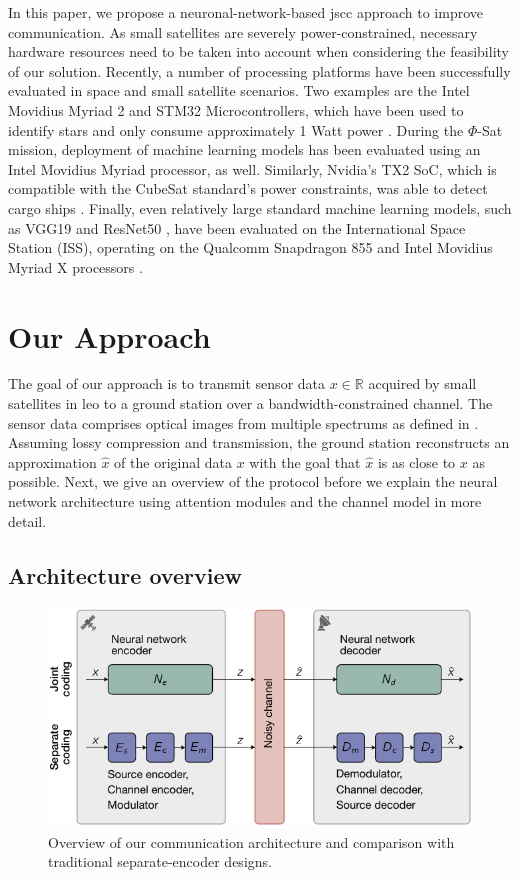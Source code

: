 \documentclass[conference]{IEEEtran}
\begin{document}
In this paper, we propose a neuronal-network-based \ac{jscc} approach to improve communication.
As small satellites are severely power-constrained, necessary hardware resources need to be taken into account when considering the feasibility of our solution.
Recently, a number of processing platforms have been successfully evaluated  in space and small satellite scenarios.
Two examples are the Intel Movidius Myriad 2 and STM32 Microcontrollers, which have been used to identify stars and only consume approximately 1 Watt power \cite{8556744}.
During the $\Phi$-Sat mission, deployment of machine learning models has been evaluated using an Intel Movidius Myriad processor, as well.
Similarly, Nvidia's TX2 SoC, which is compatible with the CubeSat standard's power constraints, was able to detect cargo ships \cite{8556744}.
Finally, even relatively large standard machine learning models, such as VGG19 \cite{DBLP:journals/corr/SimonyanZ14a} and ResNet50 \cite{7780459}, have been evaluated on the International Space Station (ISS), operating on the Qualcomm Snapdragon 855 and Intel Movidius Myriad X processors \cite{9884906}.


\section{Our Approach}
\label{sec:our_approach}

The goal of our approach is to transmit sensor data $x \in \mathbb{R}$ acquired by small satellites in \ac{leo} to a ground station over a bandwidth-constrained channel.
The sensor data comprises optical images from multiple spectrums as defined in .
Assuming lossy compression and transmission, the ground station reconstructs an approximation $\hat{x}$ of the original data $x$ with the goal that $\hat{x}$ is as close to $x$ as possible.
Next, we give an overview of the protocol before we explain the neural network architecture using attention modules and the channel model in more detail.

\subsection{Architecture overview}

\begin{figure}
  \includegraphics[width=\linewidth]{figures/coding-decoding}

  \caption{Overview of our communication architecture and comparison with traditional separate-encoder designs.}
  \label{fig:overview}
\end{figure}
\end{document}
